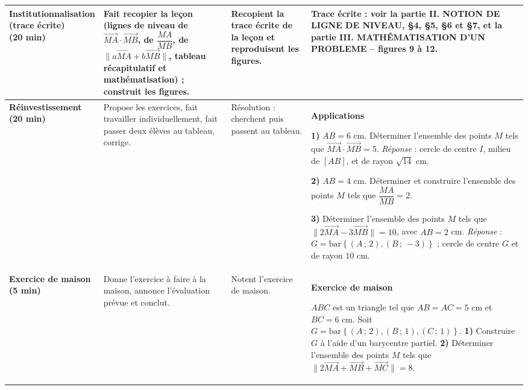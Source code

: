 \documentclass[10pt,a4paper]{article}
\newcommand{\vc}[1]{\overrightarrow{#1}}                     %
\newcommand{\barG}[1]{\mathrm{bar}\left\{#1\right\}}          %
\begin{document}
{\begin{longtable}{|L{3.0cm}|L{4.5cm}|L{3.5cm}|L{5.5cm}|}
\textbf{\color{cDef}Institutionnalisation\newline(trace écrite)\newline(20 min)}
& Fait recopier la leçon (lignes de niveau de $\vc{MA}\cdot\vc{MB}$, de $\dfrac{MA}{MB}$, de $\lVert a\vc{MA}+b\vc{MB}\rVert$, tableau récapitulatif et mathématisation) ; construit les figures.
& Recopient la trace écrite de la leçon et reproduisent les figures.
& \textbf{\color{cDef}Trace écrite} : voir la partie \textcolor{cPartie}{II. NOTION DE LIGNE DE NIVEAU}, \S 4, \S 5, \S 6 et \S 7, et la partie \textcolor{cPartie}{III. MATHÉMATISATION D'UN PROBLEME} -- figures 9 à 12.
\\\hline

\textbf{\color{cApp}Réinvestissement\newline(20 min)}
& Propose les exercices, fait travailler individuellement, fait passer deux élèves au tableau, corrige.
& Résolution : cherchent puis passent au tableau.
& \textbf{\color{cApp}Applications}\par
\textbf{1)} $AB=6$ cm. Déterminer l'ensemble des points $M$ tels que $\vc{MA}\cdot\vc{MB}=5$.\newline
\emph{Réponse} : cercle de centre $I$, milieu de $[AB]$, et de rayon $\sqrt{14}$ cm.\par
\textbf{2)} $AB=4$ cm. Déterminer et construire l'ensemble des points $M$ tels que $\dfrac{MA}{MB}=2$.\par
\textbf{3)} Déterminer l'ensemble des points $M$ tels que $\lVert 2\vc{MA}-3\vc{MB}\rVert=10$, avec $AB=2$ cm.\newline
\emph{Réponse} : $G=\barG{(A\,;\,2),(B\,;\,-3)}$ ; cercle de centre $G$ et de rayon $10$ cm.
\\\hline

\textbf{\color{cApp}Exercice de maison\newline(5 min)}
& Donne l'exercice à faire à la maison, annonce l'évaluation prévue et conclut.
& Notent l'exercice de maison.
& \textbf{\color{cApp}Exercice de maison}\par
$ABC$ est un triangle tel que $AB=AC=5$ cm et $BC=6$ cm. Soit $G=\barG{(A\,;\,2),(B\,;\,1),(C\,;\,1)}$.\newline
\textbf{1)} Construire $G$ à l'aide d'un barycentre partiel.\newline
\textbf{2)} Déterminer l'ensemble des points $M$ tels que $\lVert 2\vc{MA}+\vc{MB}+\vc{MC}\rVert=8$.
\\\hline


\end{longtable}}
\end{document}

